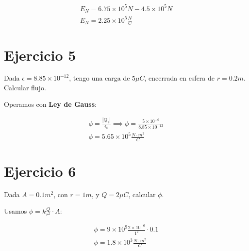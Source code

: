 \begin{align*}
    E_N = 6.75 \times 10^{5} N - 4.5 \times 10^{5} N \\
    \boxed{E_N = 2.25 \times 10^{5} \frac{N}{C}}
\end{align*}

\section{Ejercicio 5}

Dada \(\epsilon = 8.85 \times 10^{-12} \), 
tengo una carga de \(5 \mu C\),
encerrada en esfera de \(r=0.2m\).
Calcular flujo.

Operamos con \textbf{Ley de Gauss}:

\begin{align*}
    \phi = \frac{|Q_1|}{\epsilon_0} \implies \phi = \frac{5 \times 10^{-6}}{8.85 \times 10^{-12}} \\
    \boxed{\phi = 5.65 \times 10^{5} \frac{N\cdot m^{2}}{C}}
\end{align*}

\section{Ejercicio 6}

Dada \(A = 0.1m^{2}\),
con \(r = 1m\),
y \(Q = 2 \mu C\),
calcular \(\phi\).

Usamos \(\phi = k\frac{Q}{r^{2}} \cdot A\):

\begin{align*}
    \phi = 9\times10^{9} \frac{2\times10^{-6}}{1^{2}}\cdot 0.1 \\
    \boxed{\phi = 1.8\times10^{3} \frac{N\cdot m^{2}}{C}}
\end{align*}